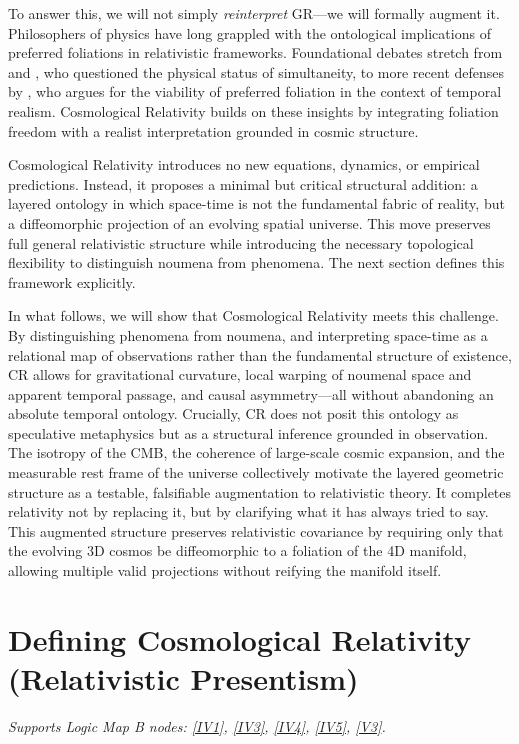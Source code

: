 \documentclass[12pt]{book}
\begin{document}
To answer this, we will not simply \textit{reinterpret} GR---we will formally augment it. Philosophers of physics have long grappled with the ontological implications of preferred foliations in relativistic frameworks. Foundational debates stretch from \citet{reichenbach1958} and \citet{grunbaum1963}, who questioned the physical status of simultaneity, to more recent defenses by \citet{maudlin2002,maudlin2012}, who argues for the viability of preferred foliation in the context of temporal realism. Cosmological Relativity builds on these insights by integrating foliation freedom with a realist interpretation grounded in cosmic structure.

Cosmological Relativity introduces no new equations, dynamics, or empirical predictions. Instead, it proposes a minimal but critical structural addition: a layered ontology in which space-time is not the fundamental fabric of reality, but a diffeomorphic projection of an evolving spatial universe. This move preserves full general relativistic structure while introducing the necessary topological flexibility to distinguish noumena from phenomena. The next section defines this framework explicitly.

In what follows, we will show that Cosmological Relativity meets this challenge. By distinguishing phenomena from noumena, and interpreting space-time as a relational map of observations rather than the fundamental structure of existence, CR allows for gravitational curvature, local warping of noumenal space and apparent temporal passage, and causal asymmetry---all without abandoning an absolute temporal ontology. Crucially, CR does not posit this ontology as speculative metaphysics but as a structural inference grounded in observation. The isotropy of the CMB, the coherence of large-scale cosmic expansion, and the measurable rest frame of the universe collectively motivate the layered geometric structure as a testable, falsifiable augmentation to relativistic theory. It completes relativity not by replacing it, but by clarifying what it has always tried to say. This augmented structure preserves relativistic covariance by requiring only that the evolving 3D cosmos be diffeomorphic to a foliation of the 4D manifold, allowing multiple valid projections without reifying the manifold itself.

\section[Defining Cosmological Relativity]{Defining Cosmological Relativity (Relativistic Presentism)}\label{sec:5.1}
\noindent\textit{Supports Logic Map B nodes: \hyperref[appendix:IV1]{[IV1]}, \hyperref[appendix:IV3]{[IV3]}, \hyperref[appendix:IV4]{[IV4]}, \hyperref[appendix:IV5]{[IV5]}, \hyperref[appendix:V3]{[V3]}.}
\end{document}
